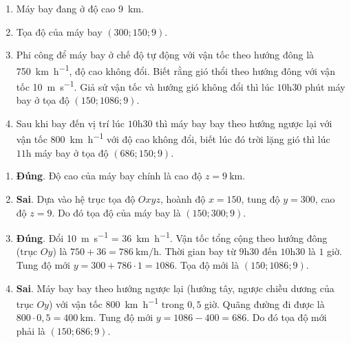 \begin{baitap}
\begin{center}
	\end{center}
	\begin{enumerate}
		\item Máy bay đang ở độ cao \qty{9}{\kilo\meter}.
		\item Tọa độ của máy bay $(300; 150; 9)$.
		\item Phi công để máy bay ở chế độ tự động với vận tốc theo hướng đông là \qty{750}{\kilo\meter\per\hour}, độ cao không đổi. Biết rằng gió thổi theo hướng đông với vận tốc \qty{10}{\meter\per\second}. Giả sử vận tốc và hướng gió không đổi thì lúc $10\mathrm{h}30$ phút máy bay ở tọa độ $(150; 1086; 9)$.
		\item Sau khi bay đến vị trí lúc $10\mathrm{h}30$ thì máy bay bay theo hướng ngược lại với vận tốc \qty{800}{\kilo\meter\per\hour} với độ cao không đổi, biết lúc đó trời lặng gió thì lúc $11\mathrm{h}$ máy bay ở tọa độ $(686; 150; 9)$.
	\end{enumerate}
	\begin{traloi}
		\begin{enumerate}
			\item \textbf{Đúng}. Độ cao của máy bay chính là cao độ $z = \qty{9}{\kilo\meter}$.
			\item \textbf{Sai}. Dựa vào hệ trục tọa độ $Oxyz$, hoành độ $x = 150$, tung độ $y = 300$, cao độ $z = 9$. Do đó tọa độ của máy bay là $(150; 300; 9)$.
			\item \textbf{Đúng}. Đổi \qty{10}{\meter\per\second} = \qty{36}{\kilo\meter\per\hour}. Vận tốc tổng cộng theo hướng đông (trục $Oy$) là $750 + 36 = \qty{786}{\kilo\meter\per\hour}$.
			Thời gian bay từ $9\mathrm{h}30$ đến $10\mathrm{h}30$ là $1$ giờ.
			Tung độ mới $y = 300 + 786 \cdot 1 = 1086$. Tọa độ mới là $(150; 1086; 9)$.
			\item \textbf{Sai}. Máy bay bay theo hướng ngược lại (hướng tây, ngược chiều dương của trục $Oy$) với vận tốc \qty{800}{\kilo\meter\per\hour} trong $0{,}5$ giờ.
			Quãng đường đi được là $800 \cdot 0{,}5 = \qty{400}{\kilo\meter}$.
			Tung độ mới $y = 1086 - 400 = 686$. Do đó tọa độ mới phải là $(150; 686; 9)$.
		\end{enumerate}
	\end{traloi}
\end{baitap}
